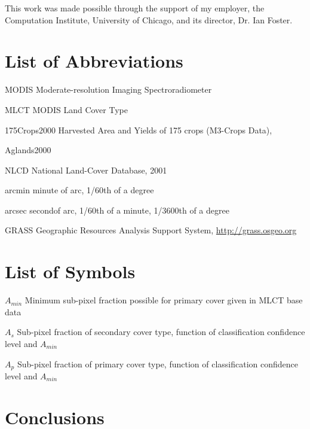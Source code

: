 \documentclass[draftthesis]{neiuthesis}
\begin{document}
This work was made possible through the support of my employer, the
Computation Institute, University of Chicago, and its director,
Dr. Ian Foster.  


\tableofcontents \listoftables \listoffigures

\chapter{List of Abbreviations}

\begin{symbollist*}
\item[MODIS] Moderate-resolution Imaging Spectroradiometer
\item[MLCT] MODIS Land Cover Type \citep{MLCT}
\item[175Crops2000] Harvested Area and Yields of 175 crops (M3-Crops
Data), \citep{Monfreda2008}
\item[Aglands2000] \citep{Ramankutty2008}
\item[NLCD] National Land-Cover Database, 2001 \citep{Homer2004}
\item[arcmin] minute of arc, 1/60th of a degree
\item[arcsec] secondof arc, 1/60th of a minute, 1/3600th of a degree
\item[GRASS] Geographic Resources Analysis Support System, \url{http://grass.osgeo.org}

\end{symbollist*}

\chapter{List of Symbols}

\begin{symbollist}[0.7in]
\item[$A_{min}$] Minimum sub-pixel fraction possible for primary cover
  given in MLCT base data
\item[$A_s$] Sub-pixel fraction of secondary cover type, function of
  classification confidence level and $A_{min}$
\item[$A_p$] Sub-pixel fraction of primary cover type, function of
 classification confidence level and $A_{min}$
\end{symbollist}

\mainmatter

\todototoc
\listoftodos





\chapter{Conclusions}


\appendix*

%

\backmatter


\end{document}

